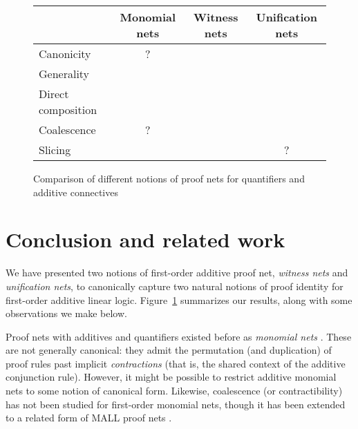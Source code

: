 \documentclass[UKenglish]{lipics-v2019}
\newcommand\xmark{{\color{red}\ding{55}}}
\newcommand\vmark{{\color{green}\ding{51}}}
\newcommand\+{+}
\renewcommand\*{\times}
\begin{document}

\begin{figure}[!t]
\begin{center}
\begin{tabular}{lccc}
 &	Monomial nets & Witness nets & Unification nets
\\\hline
   Canonicity          &    ?   & \vmark & \vmark
\\ Generality          & \xmark & \xmark & \vmark
\\ Direct composition  & \xmark & \vmark & \vmark
\\ Coalescence         &    ?   & \vmark & \vmark
\\ Slicing             & \vmark & \vmark &   ?
\end{tabular}  
  \caption{Comparison of different notions of proof nets for quantifiers and additive connectives}
  \label{fig:results}
\end{center}
\vskip-8pt
\end{figure}



\section{Conclusion and related work}

We have presented two notions of first-order additive proof net, \emph{witness nets} and \emph{unification nets}, to canonically capture two natural notions of proof identity for first-order additive linear logic. Figure~\ref{fig:results} summarizes our results, along with some observations we make below. 

Proof nets with additives and quantifiers existed before as \emph{monomial nets} \cite{Girard-1996}. These are not generally canonical: they admit the permutation (and duplication) of proof rules past implicit \emph{contractions} (that is, the shared context of the additive conjunction rule). However, it might be possible to restrict additive monomial nets to some notion of canonical form. Likewise, coalescence (or contractibility) has not been studied for first-order monomial nets, though it has been extended to a related form of MALL proof nets \cite{Maieli-2007}.
\end{document}
